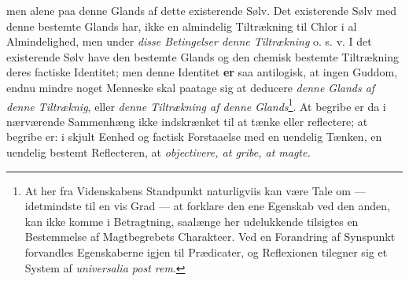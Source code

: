 \documentclass[11pt]{book}
\begin{document}
men alene paa denne Glands af dette existerende Sølv. Det existerende
Sølv med denne bestemte Glands har, ikke en almindelig Tiltrækning til
Chlor i al Almindelighed, men under \emph{disse Betingelser denne
Tiltrækning} o. s. v. I det existerende Sølv have den bestemte Glands
og den chemisk bestemte Tiltrækning deres factiske Identitet; men denne
Identitet \textbf{er} saa antilogisk, at ingen Guddom, endnu mindre
noget Menneske skal paatage sig at deducere \emph{denne Glands af denne
Tiltræknig}, eller
\emph{denne Tiltrækning af denne Glands}\footnote{At her fra
Videnskabens Standpunkt naturligviis kan være Tale om ---
idetmindste til en vis Grad --- at forklare den ene Egenskab ved den
anden, kan ikke komme i Betragtning, saalænge her udelukkende tilsigtes
en Bestemmelse af Magtbegrebets Charakteer. Ved en Forandring af
Synspunkt forvandles Egenskaberne igjen til Prædicater, og Reflexionen
tilegner sig et System af \textit{universalia post rem}.}. At begribe
er da i nærværende Sammenhæng ikke indskrænket til at tænke eller
reflectere; at begribe er: i skjult Eenhed og factisk Forstaaelse med
en uendelig Tænken, en uendelig bestemt Reflecteren, at
\emph{objectivere, at gribe, at magte.}
\end{document}
